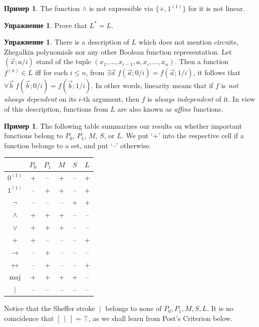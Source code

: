 \documentclass[12pt,notitlepage]{article}
\theoremstyle{plain}
\theoremstyle{definition}
\newtheorem{exc}[thm]{Упражнение}
\newtheorem{exm}[thm]{Пример}
\theoremstyle{plain}
\newcommand{\1}{\mathbf{1}}
\newcommand{\0}{\mathbf{0}}
\newcommand{\dvd}{\mathop{\mid}}
\begin{document}
\begin{exm}
	The function $\wedge$ is not expressible via $\{{+}, 1^{(1)}\}$ for it is not linear.
\end{exm}

\begin{exc}
	Prove that $L^* = L$.
\end{exc}

\begin{exc}
	There is a description of $L$ which does not mention circuits, Zhegalkin polynomials nor any other Boolean function representation. Let $(\vec x; a/i)$ stand of the tuple $(x_1,\ldots,x_{i-1},a, x_i,\ldots, x_n)$. Then a function $f^{(n)} \in L$ iff for each $i \leq n$,
	from $\exists \vec a\; f(\vec a; 0/i) = f(\vec a; 1/i)$, it follows that $\forall \vec b\; f(\vec b; 0/i) = f(\vec b; 1/i)$. In other words, linearity means that if $f$ is \emph{not always dependent} on its $i$-th argument, then $f$ is \emph{always independent} of it. In view of this description, functions from $L$ are also known as \emph{affine} functions.
\end{exc}

\medskip

\begin{exm}\label{bool:in_clones}
	The following table summarizes our results on whether important functions belong to $P_0$, $P_1$, $M$, $S$, or $L$. We put `+' into the respective cell if a function belongs to a set, and put `--' otherwise. 
	\begin{center}
		{\large
			\begin{tabular}{|c|c|c|c|c|c|}
				\hline
				&$P_0$ & $P_1$ & $M$ & $S$ & $L$\\
				\hline
				$0^{(1)}$&+&--&+&--&+\\
				\hline
				$1^{(1)}$&--&+&+&--&+\\
				\hline
				$\neg$&--&--&--&+&+\\
				\hline
				$\wedge$&+&+&+&--&--\\
				\hline
				$\vee$&+&+&+&--&--\\
				\hline
				$+$&+&--&--&--&+\\
				\hline
				$\to$&--&+&--&--&--\\
				\hline
				$\leftrightarrow$&--&+&--&--&+\\
				\hline
				$\mathrm{maj}$&+&+&+&+&--\\
				\hline
				$\dvd$&--&--&--&--&--\\
				\hline
			\end{tabular}
		}
	\end{center}
	Notice that the Sheffer stroke ${\dvd}$ belongs to none of $P_0, P_1, M, S, L$. It is no coincidence that $[\,{\dvd}\,] = \top$, as we shall learn from Post's Criterion below.
\end{exm}
\end{document}
